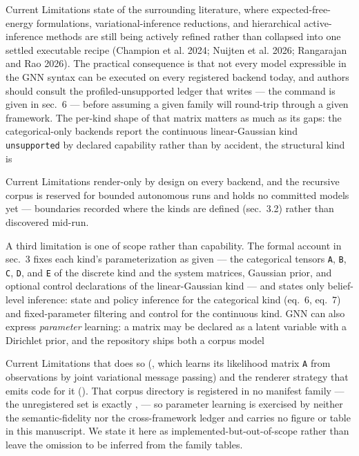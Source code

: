 \documentclass[
  ignorenonframetext,
]{beamer}
\begin{document}
\begin{frame}{Current Limitations}
state of the surrounding literature, where expected-free-energy
formulations, variational-inference reductions, and hierarchical
active-inference methods are still being actively refined rather than
collapsed into one settled executable recipe (Champion et al. 2024;
Nuijten et al. 2026; Rangarajan and Rao 2026). The practical consequence
is that not every model expressible in the GNN syntax can be executed on
every registered backend today, and authors should consult the
profiled-unsupported ledger that
 writes --- the
command is given in sec.~6 --- before assuming a
given family will round-trip through a given framework. The per-kind
shape of that matrix matters as much as its gaps: the categorical-only
backends report the continuous linear-Gaussian kind \texttt{unsupported}
by declared capability rather than by accident, the structural kind is
\end{frame}

\begin{frame}{Current Limitations}
render-only by design on every backend, and the recursive corpus is
reserved for bounded autonomous runs and holds no committed models yet
--- boundaries recorded where the kinds are defined
(sec.~3.2) rather than discovered mid-run.

A third limitation is one of scope rather than capability. The formal
account in sec.~3 fixes each kind's
parameterization as given --- the categorical tensors \texttt{A},
\texttt{B}, \texttt{C}, \texttt{D}, and \texttt{E} of the discrete kind
and the system matrices, Gaussian prior, and optional control
declarations of the linear-Gaussian kind --- and states only
belief-level inference: state and policy inference for the categorical
kind (eq.~6, eq.~7) and fixed-parameter filtering
and control for the continuous kind. GNN can also express
\emph{parameter} learning: a matrix may be declared as a latent variable
with a Dirichlet prior, and the repository ships both a corpus model
\end{frame}

\begin{frame}{Current Limitations}
that does so
(,
which learns its likelihood matrix \texttt{A} from observations by joint
variational message passing) and the renderer strategy that emits code
for it (). That
corpus directory is registered in no manifest family --- the
unregistered set is exactly ,
 --- so parameter learning is
exercised by neither the semantic-fidelity nor the cross-framework
ledger and carries no figure or table in this manuscript. We state it
here as implemented-but-out-of-scope rather than leave the omission to
be inferred from the family tables.

\end{frame}
\end{document}
